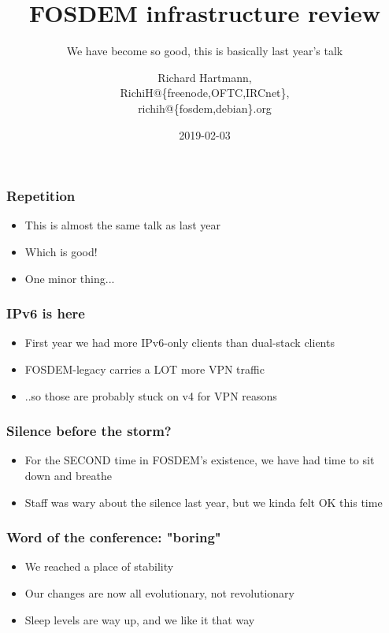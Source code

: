 \documentclass[aspectratio=169]{beamer}
\title{FOSDEM infrastructure review}
\subtitle{We have become so good, this is basically last year's talk}
\author{Richard Hartmann,\\
RichiH@\{freenode,OFTC,IRCnet\},\\
richih@\{fosdem,debian\}.org}
\date{2019-02-03}
\begin{document}
\setcounter{tocdepth}{1}

\begin{frame}
	\titlepage
\end{frame}





\begin{frame}
	\frametitle{Repetition}
	\vfill
	\begin{itemize}
		\item This is almost the same talk as last year
		\item Which is good!
		\item One minor thing...
	\end{itemize}
	\vfill
\end{frame}

\begin{frame}
	\frametitle{IPv6 is here}
	\vfill
	\begin{itemize}
		\item First year we had more IPv6-only clients than dual-stack clients
		\item FOSDEM-legacy carries a LOT more VPN traffic
		\item ..so those are probably stuck on v4 for VPN reasons
	\end{itemize}
	\vfill
\end{frame}

\begin{frame}
	\frametitle{Silence before the storm?}
	\vfill
	\begin{itemize}
		\item For the SECOND time in FOSDEM's existence, we have had time to sit down and breathe
		\item Staff was wary about the silence last year, but we kinda felt OK this time
	\end{itemize}
	\vfill
\end{frame}

\begin{frame}
	\frametitle{Word of the conference: "boring"}
	\vfill
	\begin{itemize}
		\item We reached a place of stability
		\item Our changes are now all evolutionary, not revolutionary
		\item Sleep levels are way up, and we like it that way
	\end{itemize}
	\vfill
\end{frame}
\end{document}
